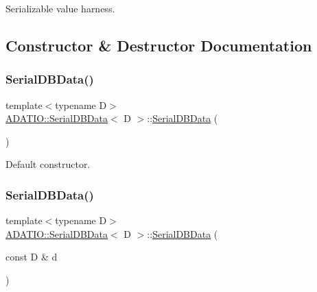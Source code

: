 Serializable value harness. 



\subsection{Constructor \& Destructor Documentation}
\mbox{\label{classADATIO_1_1SerialDBData_a07279a443371f31d9e0ef857fab17fa5}} 
\subsubsection{\texorpdfstring{SerialDBData()}{SerialDBData()}\hspace{0.1cm}{\footnotesize\ttfamily [1/9]}}
{\footnotesize\ttfamily template$<$typename D$>$ \\
\mbox{\hyperlink{classADATIO_1_1SerialDBData}{A\+D\+A\+T\+I\+O\+::\+Serial\+D\+B\+Data}}$<$ D $>$\+::\mbox{\hyperlink{classADATIO_1_1SerialDBData}{Serial\+D\+B\+Data}} (\begin{DoxyParamCaption}{ }\end{DoxyParamCaption})\hspace{0.3cm}{\ttfamily [inline]}}



Default constructor. 

\mbox{\label{classADATIO_1_1SerialDBData_afe5b91aca4221cfce681c85498a46f0c}} 
\subsubsection{\texorpdfstring{SerialDBData()}{SerialDBData()}\hspace{0.1cm}{\footnotesize\ttfamily [2/9]}}
{\footnotesize\ttfamily template$<$typename D$>$ \\
\mbox{\hyperlink{classADATIO_1_1SerialDBData}{A\+D\+A\+T\+I\+O\+::\+Serial\+D\+B\+Data}}$<$ D $>$\+::\mbox{\hyperlink{classADATIO_1_1SerialDBData}{Serial\+D\+B\+Data}} (\begin{DoxyParamCaption}\item[{const D \&}]{d }\end{DoxyParamCaption})\hspace{0.3cm}{\ttfamily [inline]}}



